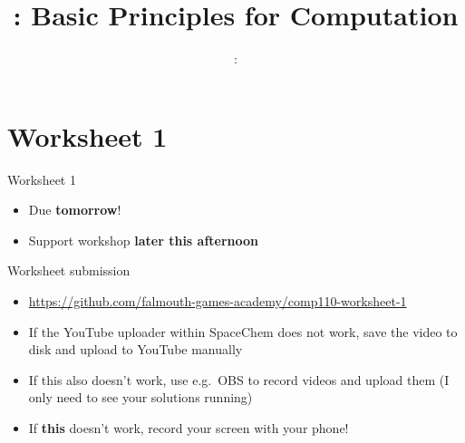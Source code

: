 \usepackage{../../beamerthemeFalmouthGamesAcademy}
\usepackage{multimedia}
\graphicspath{ {../../} }

\lstset{language=Python
}

\usepackage[normalem]{ulem}
\usepackage{wasysym}

\usepackage{pdfpages}

\usetikzlibrary{arrows,automata}




\title{\sessionnumber: Basic Principles for Computation}
\subtitle{\modulecode: \moduletitle}

\frame{\titlepage} 

\part{Worksheet 1}
\frame{\partpage}

\begin{frame}{Worksheet 1}
    \begin{itemize}
        \item Due \textbf{tomorrow}!
        \item Support workshop \textbf{later this afternoon}
    \end{itemize}
\end{frame}

\begin{frame}{Worksheet submission}
    \begin{itemize}
        \item \url{https://github.com/falmouth-games-academy/comp110-worksheet-1}
        \item If the YouTube uploader within SpaceChem does not work,
            save the video to disk and upload to YouTube manually
        \item If this also doesn't work, use e.g.\ OBS to record videos and upload them
            (I only need to see your solutions running)
        \item If \textbf{this} doesn't work, record your screen with your phone!
    \end{itemize}
\end{frame}

